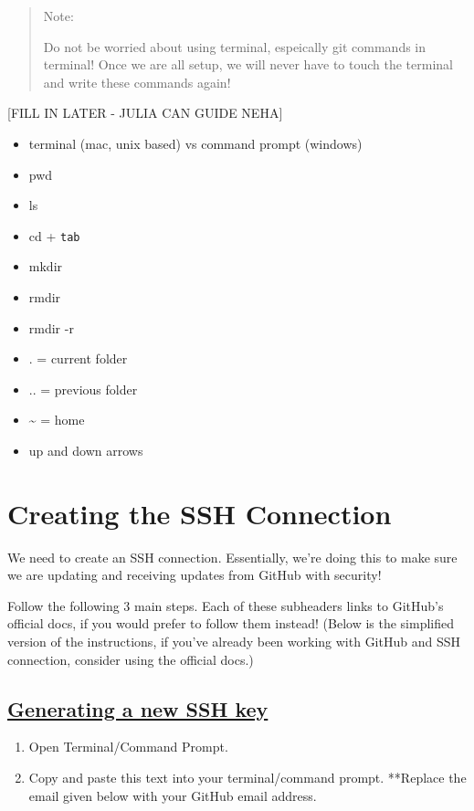 \documentclass[
]{book}
\theoremstyle{definition}
\theoremstyle{definition}
\theoremstyle{definition}
\theoremstyle{definition}
\theoremstyle{remark}
\begin{document}
\begin{quote}
Note:

Do not be worried about using terminal, espeically git commands in terminal! Once we are all setup, we will never have to touch the terminal and write these commands again!
\end{quote}

{[}FILL IN LATER - JULIA CAN GUIDE NEHA{]}

\begin{itemize}
\item
  terminal (mac, unix based) vs command prompt (windows)
\item
  pwd
\item
  ls
\item
  cd + \texttt{tab}
\item
  mkdir
\item
  rmdir
\item
  rmdir -r
\item
  . = current folder
\item
  .. = previous folder
\item
  \textasciitilde{} = home
\item
  up and down arrows
\end{itemize}

\section{Creating the SSH Connection}\label{creating-the-ssh-connection}

We need to create an SSH connection. Essentially, we're doing this to make sure we are updating and receiving updates from GitHub with security!

Follow the following 3 main steps. Each of these subheaders links to GitHub's official docs, if you would prefer to follow them instead! (Below is the simplified version of the instructions, if you've already been working with GitHub and SSH connection, consider using the official docs.)

\subsection{\texorpdfstring{\href{https://docs.github.com/en/authentication/connecting-to-github-with-ssh/generating-a-new-ssh-key-and-adding-it-to-the-ssh-agent\#generating-a-new-ssh-key}{Generating a new SSH key}}{Generating a new SSH key}}\label{generating-a-new-ssh-key}

\begin{enumerate}
\def\labelenumi{\arabic{enumi}.}
\item
  Open Terminal/Command Prompt.
\item
  Copy and paste this text into your terminal/command prompt. **Replace the email given below with your GitHub email address.
\end{enumerate}
\end{document}
